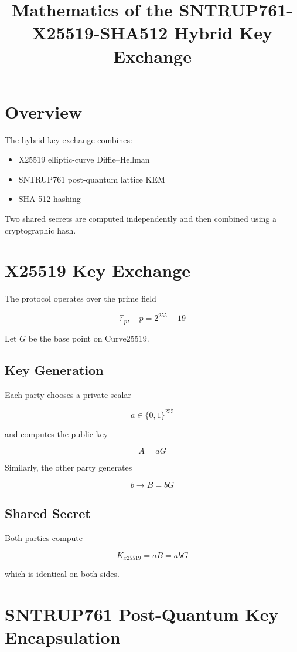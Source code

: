 \documentclass{article}
\title{Mathematics of the SNTRUP761-X25519-SHA512 Hybrid Key Exchange}
\author{}
\date{}
\begin{document}
\maketitle

\section{Overview}

The hybrid key exchange combines:

\begin{itemize}
\item X25519 elliptic-curve Diffie--Hellman
\item SNTRUP761 post-quantum lattice KEM
\item SHA-512 hashing
\end{itemize}

Two shared secrets are computed independently and then combined using a cryptographic hash.

\section{X25519 Key Exchange}

The protocol operates over the prime field

\[
\mathbb{F}_p, \quad p = 2^{255} - 19
\]

Let \(G\) be the base point on Curve25519.

\subsection{Key Generation}

Each party chooses a private scalar

\[
a \in \{0,1\}^{255}
\]

and computes the public key

\[
A = aG
\]

Similarly, the other party generates

\[
b \rightarrow B = bG
\]

\subsection{Shared Secret}

Both parties compute

\[
K_{x25519} = aB = abG
\]

which is identical on both sides.

\section{SNTRUP761 Post-Quantum Key Encapsulation}
\end{document}
